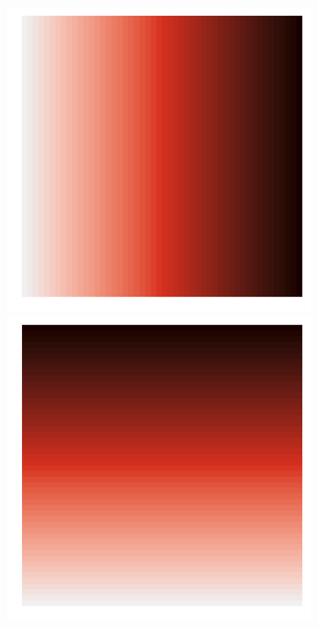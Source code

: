 \documentclass{article}
\begin{document}
\begin{figure}
 	\begin{subfigure}{0.3\textwidth}
 		\includegraphics[width=\linewidth]{figures/p_smooth1}\\
 		\includegraphics[width=\linewidth]{figures/p_smooth2}\\

\end{subfigure}
\end{figure}
\end{document}
